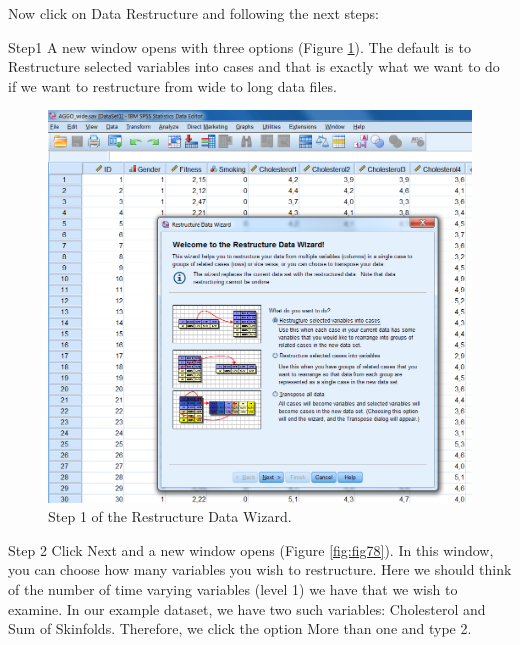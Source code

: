 \documentclass[
]{book}
\begin{document}
Now click on Data Restructure and following the next steps:

Step1
A new window opens with three options (Figure \ref{fig:fig77}). The default is to Restructure selected variables into cases and that is exactly what we want to do if we want to restructure from wide to long data files.

\begin{figure}

{\centering \includegraphics[width=0.9\linewidth]{images/fig7.7} 

}

\caption{Step 1 of the Restructure Data Wizard.}\label{fig:fig77}
\end{figure}

Step 2
Click Next and a new window opens (Figure \ref{fig:fig78}). In this window, you can choose how many variables you wish to restructure. Here we should think of the number of time varying variables (level 1) we have that we wish to examine. In our example dataset, we have two such variables: Cholesterol and Sum of Skinfolds. Therefore, we click the option More than one and type 2.
\end{document}
